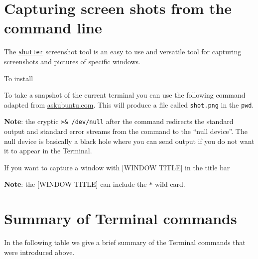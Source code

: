 \section{Capturing screen shots from the command line}

The \href{https://vitux.com/how-to-install-and-use-shutter-screenshot-tool-in-ubuntu-18-04-lts/}{\texttt{shutter}} screenshot tool is an easy to use and versatile tool for capturing screenshots and pictures of specific windows.

To install

To take a snapshot of the current terminal you can use the following command adapted from \href{https://askubuntu.com/questions/194427/what-is-the-terminal-command-to-take-a-screenshot}{askubuntu.com}. This will produce a file called \texttt{shot.png} in the \texttt{pwd}.


{\bf Note}: the cryptic \texttt{>\& /dev/null} after the command redirects the standard output and standard error streams from the command to the ``null device''.  The null device is basically a black hole where you can send output if you do not want it to appear in the Terminal.

If you want to capture a window with [WINDOW TITLE] in the title bar


{\bf Note}: the [WINDOW TITLE] can include the \texttt{*} wild card.

\section{Summary of Terminal commands}

In the following table we give a brief summary of the Terminal commands that were introduced above. 

